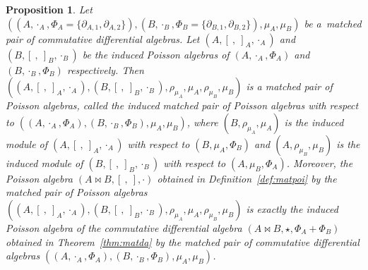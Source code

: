 \documentclass[pdftex]{sigma}
\numberwithin{equation}{section}
\newtheorem{Proposition}[Theorem]{Proposition}
{ \theoremstyle{definition}
	\newtheorem{Definition}[Theorem]{Definition}
	\newtheorem{Note}[Theorem]{Note}
	\newtheorem{Example}[Theorem]{Example}
	\newtheorem{Remark}[Theorem]{Remark} }
\begin{document}
\begin{Proposition}\label{pro:assmat}
 Let $((A, \cdot_A, \Phi_A = \{\partial_{A, 1}, \partial_{A, 2}\}), (B, \cdot_B, \Phi_B= \{\partial_{B,1},\partial_{B,2}\}), \mu_A,\mu_B)$ be a~mat\-ched pair of commutative differential algebras.
 Let $(A, [\ ,\ ]_A, \cdot_A)$ and $(B, [\ ,\ ]_B, \cdot_B)$ be the induced Poisson algebras of $(A, \cdot_A, \Phi_A)$ and $(B, \cdot_B, \Phi_B)$ respectively.
 Then $((A, [\ ,\ ]_A, \cdot_A), (B, [\ ,\ ]_B, \cdot_B), \allowbreak \rho_{\mu_A}, \mu_A, \rho_{\mu_B}, \mu_B)$ is a matched pair of Poisson algebras,
 called the induced matched pair of Poisson algebras with respect to $((A, \cdot_A, \Phi_A), (B, \cdot_B, \Phi_B),\mu_A,\mu_B)$,
 where $(B, \rho_{\mu_A}, \mu_A)$ is the induced module of $(A, [\ ,\ ]_A, \cdot_A)$ with respect to $(B, \mu_A,\Phi_B)$ and
 $(A, \rho_{\mu_B}, \mu_B)$ is the induced module of $(B, [\ ,\ ]_B, \cdot_B)$ with respect to $(A, \mu_B, \Phi_A)$.
 Moreover, the Poisson algebra $(A \bowtie B, [\ ,\ ], \cdot)$ obtained in Definition~{\rm \ref{def:matpoi}} by the matched pair of Poisson algebras
 $((A, [\ ,\ ]_A, \cdot_A), (B, [\ ,\ ]_B, \cdot_B), \rho_{\mu_A}, \mu_A,\allowbreak \rho_{\mu_B}, \mu_B)$ is exactly
 the induced Poisson algebra of the commutative differential algebra $(A \bowtie B,\allowbreak \star, \Phi_A + \Phi_B)$ obtained in Theorem~{\rm \ref{thm:matda}} by the matched pair of commutative differential algebras $((A, \cdot_A, \Phi_A), (B, \cdot_B, \Phi_B), \mu_A, \mu_B)$.
\end{Proposition}
\end{document}
